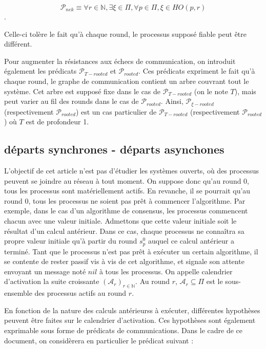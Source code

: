 \documentclass{article}
\begin{document}
$$\mathcal{P}_{nek} \equiv \forall r \in \mathds{N}, \exists \xi \in \Pi, \forall p \in \Pi, \xi \in HO(p,r)$$.

Celle-ci tolère le fait qu'à chaque round, le processus supposé fiable peut être différent.

Pour augmenter la résistances aux échecs de communication, on introduit également les prédicats $\mathcal{P}_{T-rooted}$ et $\mathcal{P}_{rooted}$.
Ces prédicats expriment le fait qu'à chaque round, le graphe de communication contient un arbre couvrant tout le système.
Cet arbre est supposé fixe dans le cas de $\mathcal{P}_{T-rooted}$ (on le note $T$), mais peut varier au fil des rounds dans le cas de $\mathcal{P}_{rooted}$.
Ainsi, $\mathcal{P}_{\xi-rooted}$ (respectivement $\mathcal{P}_{rooted}$) est un cas particulier de $\mathcal{P}_{T-rooted}$ (respectivement $\mathcal{P}_{rooted}$) où $T$ est de profondeur 1.

\subsection{départs synchrones - départs asynchones}

L'objectif de cet article n'est pas d'étudier les systèmes ouverts, où des processus peuvent se joindre au réseau à tout moment.
On suppose donc qu'au round 0, tous les processus sont matériellement actifs. En revanche, il se pourrait qu'au round 0, tous les processus ne soient pas prêt à commencer l'algorithme.
Par exemple, dans le cas d'un algorithme de consensus, les processus commencent chacun avec une valeur initiale. Admettons que cette valeur initiale soit le résultat d'un calcul antérieur.
Dans ce cas, chaque processus ne connaîtra sa propre valeur initiale qu'à partir du round $s^0_p$ auquel ce calcul antérieur a terminé.
Tant que le processus n'est pas prêt à exécuter un certain algorithme, il se contente de rester passif vis à vis de cet algorithme,
et signale son attente envoyant un message noté $nil$ à tous les processus.
On appelle calendrier d'activation la suite croissante $(\mathcal{A}_r)_{r \in \mathds{N}}$. Au round $r$, $\mathcal{A}_r \subseteq \Pi$ est le sous-ensemble des processus actifs au round $r$.

En fonction de la nature des calculs antérieurss à exécuter, différentes hypothèses peuvent être faites sur le calendrier d'activation.
Ces hypothèses sont également exprimable sous forme de prédicats de communications.
Dans le cadre de ce document, on considèrera en particulier le prédicat suivant :
\end{document}
